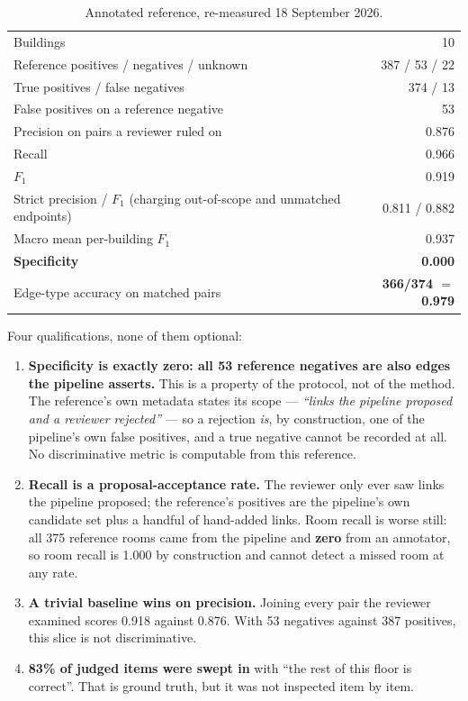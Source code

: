 \documentclass[11pt,a4paper]{article}
\newcommand{\noquote}[1]{\textcolor{warn}{\textbf{#1}}}
\begin{document}
\begin{table}[ht]
\centering
\small
\begin{tabular}{lr}
\toprule
Buildings & 10 \\
Reference positives / negatives / unknown & 387 / 53 / 22 \\
True positives / false negatives & 374 / 13 \\
False positives on a reference negative & 53 \\
\midrule
Precision on pairs a reviewer ruled on & 0.876 \\
Recall & 0.966 \\
$F_1$ & 0.919 \\
Strict precision / $F_1$ (charging out-of-scope and unmatched endpoints) & 0.811 / 0.882 \\
Macro mean per-building $F_1$ & 0.937 \\
\textbf{Specificity} & \noquote{0.000} \\
Edge-type accuracy on matched pairs & \noquote{366/374 $=$ 0.979} \\
\bottomrule
\end{tabular}
\caption{Annotated reference, re-measured 18 September 2026.}
\end{table}

Four qualifications, none of them optional:

\begin{enumerate}
  \item \textbf{Specificity is exactly zero: all 53 reference negatives are also
        edges the pipeline asserts.} This is a property of the protocol, not of
        the method. The reference's own metadata states its scope ---
        \emph{``links the pipeline proposed and a reviewer rejected''} --- so a
        rejection \emph{is}, by construction, one of the pipeline's own false
        positives, and a true negative cannot be recorded at all. No
        discriminative metric is computable from this reference.
  \item \textbf{Recall is a proposal-acceptance rate.} The reviewer only ever
        saw links the pipeline proposed; the reference's positives are the
        pipeline's own candidate set plus a handful of hand-added links. Room
        recall is worse still: all 375 reference rooms came from the pipeline
        and \textbf{zero} from an annotator, so room recall is 1.000 by
        construction and cannot detect a missed room at any rate.
  \item \textbf{A trivial baseline wins on precision.} Joining every pair the
        reviewer examined scores 0.918 against 0.876. With 53 negatives against
        387 positives, this slice is not discriminative.
  \item \textbf{83\% of judged items were swept in} with ``the rest of this
        floor is correct''. That is ground truth, but it was not inspected item
        by item.
\end{enumerate}
\end{document}
